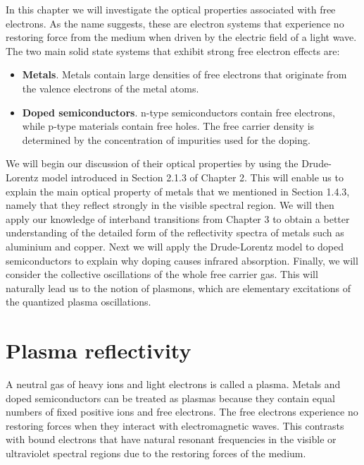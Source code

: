 \documentclass[12pt]{book}
\begin{document}
\begin{shaded}
In this chapter we will investigate the optical properties associated with free electrons. As the name suggests, these are electron systems that experience no restoring force from the medium when driven by the electric field of a light wave. The two main solid state systems that exhibit strong free electron effects are:
\begin{itemize}
  \item \textbf{Metals}. Metals contain large densities of free electrons that originate from the valence electrons of the metal atoms.
  \item \textbf{Doped semiconductors}. n-type semiconductors contain free electrons, while p-type materials contain free holes. The free carrier density is determined by the concentration of impurities used for the doping.
\end{itemize}

We will begin our discussion of their optical properties by using the Drude-Lorentz model introduced in Section 2.1.3 of Chapter 2. This will enable us to explain the main optical property of metals that we mentioned in Section 1.4.3, namely that they reflect strongly in the visible spectral region. We will then apply our knowledge of interband transitions from Chapter 3 to obtain a better understanding of the detailed form of the reflectivity spectra of metals such as aluminium and copper. Next we will apply the Drude-Lorentz model to doped semiconductors to explain why doping causes infrared absorption. Finally, we will consider the collective oscillations of the whole free carrier gas. This will naturally lead us to the notion of plasmons, which are elementary excitations of the quantized plasma oscillations.
\end{shaded}

\section{Plasma reflectivity}
A neutral gas of heavy ions and light electrons is called a plasma. Metals and doped semiconductors can be treated as plasmas because they contain equal numbers of fixed positive ions and free electrons. The free electrons experience no restoring forces when they interact with electromagnetic waves. This contrasts with bound electrons that have natural resonant frequencies in the visible or ultraviolet spectral regions due to the restoring forces of the medium.
\end{document}
